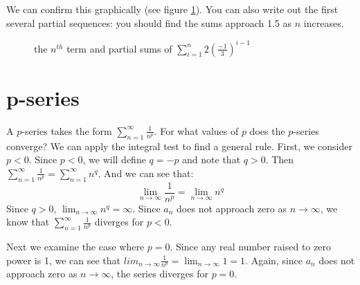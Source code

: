 We can confirm this graphically (see figure \ref{fig:geometric}). You 
can also write out the first several partial sequences: you should 
find the sums approach 1.5 as $n$ increases.

\begin{figure}[htbp]
\centering
    \caption{the $n^{th}$ term and partial sums of $\sum_{i=1}^n 
    2(\frac{-1}{3})^{i-1}$}
    \label{fig:geometric}
\end{figure}

\section{p-series}
A $p$-series takes the form $\sum_{n=1}^\infty \frac{1}{n^p}$. For what 
values of $p$ does the $p$-series converge? We can apply the integral test to 
find a general rule. First, we consider $p < 0$. 
Since $p < 0$, we will define $q = -p$ and note that $q > 0$. Then $\sum_
{n=1}^\infty \frac{1}{n^p} = \sum_{n=1}^\infty n^q$. And we can see that:
$$\lim_{n \to \infty}\frac{1}{n^p} = \lim_{n \to \infty}n^q$$
Since $q > 0$, $\lim_{n \to \infty}n^q = \infty$. Since $a_n$ does not 
approach zero as $n \to \infty$, we know that $\sum_{n = 1}^\infty 
\frac{1}{n^p}$ diverges for $p < 0$. 

Next we examine the case where $p=0$. Since any real number raised to zero 
power is 1, we can see that $lim_{n \to \infty} \frac{1}{n^p} = \lim_{n \to 
\infty} 1 = 1$. Again, since $a_n$ does not approach zero as $n \to \infty$, 
the series diverges for $p = 0$. 

